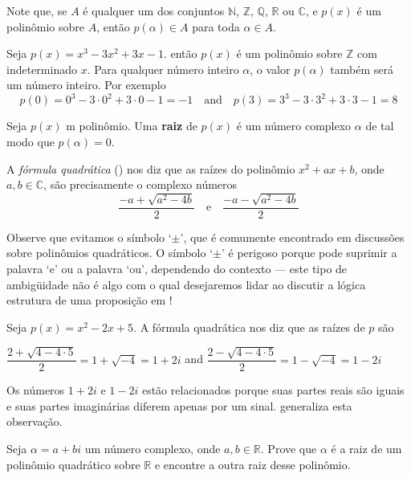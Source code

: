 Note que, se $A$ é qualquer um dos conjuntos $\mathbb{N}$, $\mathbb{Z}$, $\mathbb{Q}$, $\mathbb{R}$ ou $\mathbb{C}$, e $p(x)$ é um polinômio sobre $A$, então $p(\alpha) \in A$ para toda $\alpha \in A$.

\begin{example}
Seja $p(x)=x^3-3x^2+3x-1$. então $p(x)$ é um polinômio sobre $\mathbb{Z}$ com indeterminado $x$. Para qualquer número inteiro $\alpha$, o valor $p(\alpha)$ também será um número inteiro. Por exemplo
\[ p(0) = 0^3-3 \cdot 0^2 + 3 \cdot 0 - 1 = -1 \quad \text{and} \quad p(3) = 3^3 - 3 \cdot 3^2 + 3 \cdot 3 - 1 = 8 \]
\end{example}

\begin{definition}
\label{defRootOfPolynomial}
Seja $p(x)$ m polinômio. Uma \textbf{raiz} de $p(x)$ é um número complexo $\alpha$ de tal modo que $p(\alpha)=0$.
\end{definition}

A \textit{fórmula quadrática} () nos diz que as raízes do polinômio $x^2+ax+b$, onde $a,b \in \mathbb{C}$, são precisamente o complexo números
\[ \frac{-a+\sqrt{a^2-4b}}{2} \quad \text{e} \quad \frac{-a-\sqrt{a^2-4b}}{2} \]

Observe que evitamos o símbolo `$\pm$', que é comumente encontrado em discussões sobre polinômios quadráticos. O símbolo `$\pm$' é perigoso porque pode suprimir a palavra `e' ou a palavra `ou', dependendo do contexto --- este tipo de ambigüidade não é algo com o qual desejaremos lidar ao discutir a lógica estrutura de uma proposição em !

\begin{example}
\label{exApplicationOfQuadraticFormula}
Seja $p(x)=x^2-2x+5$. A fórmula quadrática nos diz que as raízes de $p$ são
\begin{center}
$\dfrac{2 + \sqrt{4 - 4 \cdot 5}}{2} = 1 + \sqrt{-4} = 1+2i$
\quad and \quad
$\dfrac{2 - \sqrt{4 - 4 \cdot 5}}{2} = 1-\sqrt{-4} = 1-2i$
\end{center}
Os números $1+2i$ e $1-2i$ estão relacionados porque suas partes reais são iguais e suas partes imaginárias diferem apenas por um sinal.  generaliza esta observação.
\end{example}

\begin{exercise}
\label{exComplexNumberAsRootOfQuadraticOverR}
Seja $\alpha = a+bi$ um número complexo, onde $a,b \in \mathbb{R}$. Prove que $\alpha$ é a raiz de um polinômio quadrático sobre $\mathbb{R}$ e encontre a outra raiz desse polinômio.
\end{exercise}

